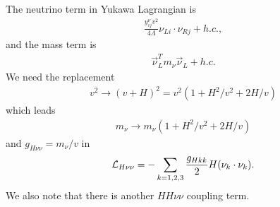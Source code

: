 \documentclass[11pt]{article}
\begin{document}
\section{ }
The neutrino term in Yukawa Lagrangian is
\begin{eqnarray}
    \frac{y_{ij}^\nu v^2}{4\Lambda} \nu_{Li} \cdot \nu_{Rj}+h.c.,
\end{eqnarray}
and the mass term is 
\begin{eqnarray}
    \vec{\nu}_L^T m_\nu \vec{\nu}_L+ h.c.
\end{eqnarray}
We need the replacement 
\begin{eqnarray}
    v^2 \to (v+H)^2=v^2(1+H^2/v^2+2H/v)
\end{eqnarray}
which leads
\begin{eqnarray}
    m_\nu \to m_\nu(1+H^2/v^2+2H/v)
\end{eqnarray}
and $g_{H\nu\nu}=m_\nu/v $ in
\begin{eqnarray}
    {\cal L}_{H\nu\nu} = - \sum_{k=1,2,3} \frac{g_{Hkk}}{2} H (\nu_k \cdot \nu_k).
\end{eqnarray}
We also note that there is another $HH\nu\nu$ coupling term.
\end{document}
